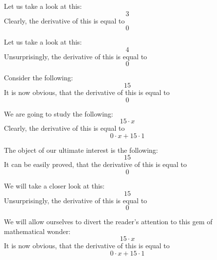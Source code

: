 \documentclass{article}
\begin{document}
Let us take a look at this:
\begin{equation}
3 
\end{equation}
Clearly, the derivative of this is equal to
\begin{equation}
0 
\end{equation}

Let us take a look at this:
\begin{equation}
4 
\end{equation}
Unsurprisingly, the derivative of this is equal to
\begin{equation}
0 
\end{equation}

Consider the following:
\begin{equation}
15 
\end{equation}
It is now obvious, that the derivative of this is equal to
\begin{equation}
0 
\end{equation}

We are going to study the following:
\begin{equation}
15 \cdot x 
\end{equation}
Clearly, the derivative of this is equal to
\begin{equation}
0 \cdot x + 15 \cdot 1 
\end{equation}

The object of our ultimate interest is the following:
\begin{equation}
15 
\end{equation}
It can be easily proved, that the derivative of this is equal to
\begin{equation}
0 
\end{equation}

We will take a closer look at this:
\begin{equation}
15 
\end{equation}
Unsurprisingly, the derivative of this is equal to
\begin{equation}
0 
\end{equation}

We will allow ourselves to divert the reader's attention to this gem of mathematical wonder:
\begin{equation}
15 \cdot x 
\end{equation}
It is now obvious, that the derivative of this is equal to
\begin{equation}
0 \cdot x + 15 \cdot 1 
\end{equation}
\end{document}
